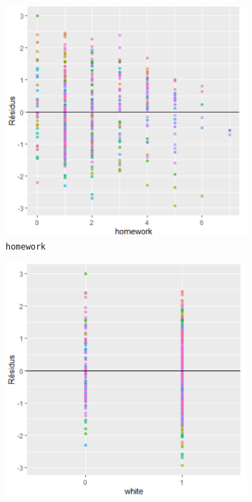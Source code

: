 \documentclass{article}
\begin{document}
\begin{figure}[H]  %
	\centering
	\begin{subfigure}{0.48\textwidth}
		\includegraphics[width=1\textwidth]{graphiques/Residus_VS_Homework}
		\caption{\texttt{homework}}
		\label{Residus_VS_Homework}
	\end{subfigure}
	\begin{subfigure}{0.48\textwidth}
		\includegraphics[width=1\textwidth]{graphiques/Residus_VS_white}

\end{subfigure}
\end{figure}
\end{document}
